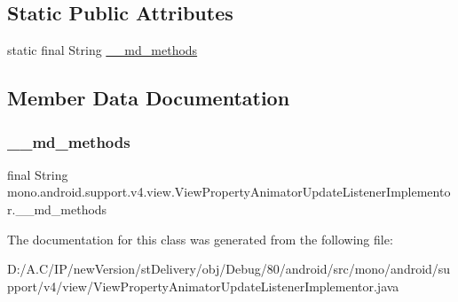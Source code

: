\subsection*{Static Public Attributes}
\begin{DoxyCompactItemize}
\item 
static final String \hyperlink{classmono_1_1android_1_1support_1_1v4_1_1view_1_1_view_property_animator_update_listener_implementor_af516b0230225633ea96b66269a4242c3}{\+\_\+\+\_\+md\+\_\+methods}
\end{DoxyCompactItemize}


\subsection{Member Data Documentation}
\mbox{\label{classmono_1_1android_1_1support_1_1v4_1_1view_1_1_view_property_animator_update_listener_implementor_af516b0230225633ea96b66269a4242c3}} 
\subsubsection{\texorpdfstring{\+\_\+\+\_\+md\+\_\+methods}{\_\_md\_methods}}
{\footnotesize\ttfamily final String mono.\+android.\+support.\+v4.\+view.\+View\+Property\+Animator\+Update\+Listener\+Implementor.\+\_\+\+\_\+md\+\_\+methods\hspace{0.3cm}{\ttfamily [static]}}



The documentation for this class was generated from the following file\+:\begin{DoxyCompactItemize}
\item 
D\+:/\+A.\+C/\+I\+P/new\+Version/st\+Delivery/obj/\+Debug/80/android/src/mono/android/support/v4/view/View\+Property\+Animator\+Update\+Listener\+Implementor.\+java\end{DoxyCompactItemize}
